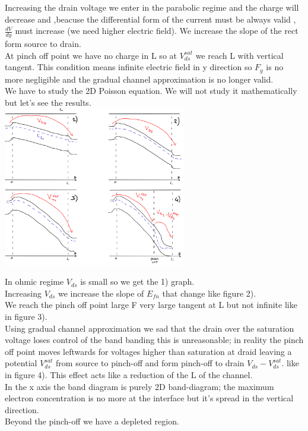 Increasing the drain voltage we enter in the parabolic regime and the charge will decrease and ,beacuse the differential form of the current must be always valid , $\frac{dV}{dy}$ must increase (we need higher electric field). We increase the slope of the rect form source to drain.\\
At pinch off point we have no charge in L so at $V_{ds}^{sat}$ we reach L with vertical tangent. This condition means infinite electric field in y direction so $F_y$ is no more negligible and the gradual channel approximation is no longer valid.\\
We have to study the 2D Poisson equation. We will not study it mathematically but let's see the results.\\

\centering
\includegraphics[width=0.6\textwidth]{pograph.png}\\
\raggedright

In ohmic regime $V_{ds}$ is small so we get the 1) graph.\\
Increasing $V_{ds}$ we increase the slope of $E_{fn}$ that change like figure 2).\\
We reach the pinch off point large F very large tangent at L but not infinite like in figure 3).\\
Using gradual channel approximation we sad that the drain over the saturation voltage loses control of the band banding this is unreasonable; in reality the pinch off point moves leftwards for voltages higher than saturation at draid leaving a potential $V_{ds}^{sat}$ from source to pinch-off and form pinch-off to drain $V_{ds}-V_{ds}^{sat}$. like in figure 4).
This effect acts like a reduction of the L of the channel.\\
In the x axis the band diagram is purely 2D band-diagram; the maximum electron concentration is no more at the interface but it's spread in the vertical direction.\\ Beyond the pinch-off we have a depleted region.\\

